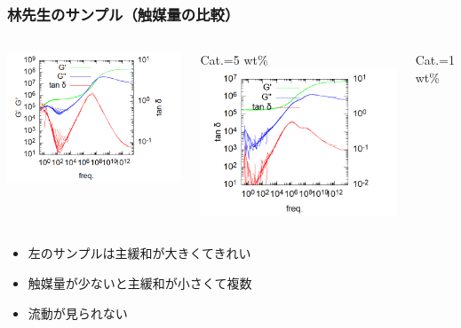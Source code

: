 \documentclass[1４pt, dvipdfmx]{beamer}
\begin{document}
\begin{frame}
	\frametitle{林先生のサンプル（触媒量の比較）}
		\begin{columns}[T, onlytextwidth]
			\centering
				\includegraphics[width=\textwidth]{sample_1.png}

				Cat.=5 wt\%
			\centering
			\includegraphics[width=\textwidth]{sample_1_cat_1per.png}

			Cat.=1 wt\%
		\end{columns}

		\begin{itemize}
			\item 左のサンプルは主緩和が大きくてきれい
			\item 触媒量が少ないと主緩和が小さくて複数
			\item 流動が見られない
		\end{itemize}
\end{frame}
\end{document}
